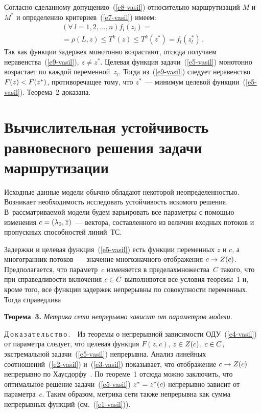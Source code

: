 \begin{multicols}{2}
  Согласно сделанному допущению~(\ref{e8-vasil}) относительно маршрутизаций 
$M$ и $M^*$ и определению критериев~(\ref{e7-vasil}) имеем:
\begin{multline*}
  \left(\forall\ l=1,2,\ldots , n\right) f_l(z_l) ={}\\
  {}=\rho(L,z)\leq T^k(z)\leq 
T^k(z^*)=f_l(z_l^*)\,.
\end{multline*}
  Так как функции задержек монотонно возрастают, отсюда получаем 
неравенства~(\ref{e9-vasil}), $z\not=z^*$. Целевая функция задачи~(\ref{e5-vasil}) 
монотонно воз\-рас\-та\-ет по каждой переменной~$z_l$. Тогда из~(\ref{e9-vasil}) 
следует неравенство $F(z)\hm<F(z^*)$, противоречащее тому, что $z^*$~--- 
минимум целевой функции~(\ref{e5-vasil}). Теорема~2 доказана.
  
  
  \section{Вычислительная устойчивость равновесного решения задачи 
маршрутизации} 
  
  Исходные данные модели обычно обладают некоторой неопределенностью. 
Возникает необходимость исследовать устойчивость искомого решения. 
В~рассматриваемой модели будем варьировать все параметры с помощью 
изменения $c\hm= (\lambda_0,\overline{z})$~--- вектора, составленного из величин 
входных потоков и пропускных способностей линий~ТС. 
  
  Задержки и целевая функция~(\ref{e5-vasil}) есть функции переменных $z$ и $c$, а 
многогранник потоков~--- значение многозначного отображения $c\hm\to Z(c)$. 
Пред\-полагается, что параметр~$c$ изменяется в пределах\linebreak множества~$C$ такого, 
что при справедливости включения $c\hm\in C$ выполняются все условия 
теоремы~1 и, кроме того, все функции задержек непрерывны по совокупности 
переменных. Тогда справедлива
  
  \smallskip
  
  \noindent
  \textbf{Теорема~3.} \textit{Метрика сети непрерывно зависит от параметров 
модели.}
  
  \smallskip
  
  \noindent
  Д\,о\,к\,а\,з\,а\,т\,е\,л\,ь\,с\,т\,в\,о\,.\ \ Из теоремы о непрерывной зависимости 
ОДУ~(\ref{e4-vasil}) от параметра следует, что целевая функция
  $
  F(z,c)$, $z \hm\in Z(c)$, $c\hm\in C$,  экстремальной задачи~(\ref{e5-vasil}) 
непрерывна. Анализ линейных соотношений~(\ref{e2-vasil}) и~(\ref{e3-vasil}) 
показывает, что отображение $c\hm\to Z(c)$ непрерывно по 
  Хаусдорфу~\cite{11-vasil}. По теореме~1 отсюда можно заключить, что 
оптимальное решение задачи~(\ref{e5-vasil}) $z^*\hm=z^*(c)$ непрерывно зависит 
от параметра~$c$. Таким образом, метрика сети также непрерывна как сумма 
непрерывных функций (см.~(\ref{e1-vasil})).
  

\end{multicols}
